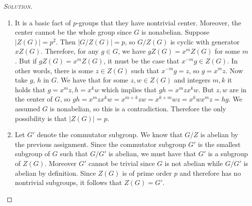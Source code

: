 \begin{proof}[{\scshape Solution}]

  \hfill

  \begin{enumerate}[font=\normalfont,label=\textbf{(\Alph*)}, wide]

    \item It is a basic fact of $p$-groups that they have nontrivial center. Moreover, the center cannot be the whole group since $G$ is nonabelian. Suppose $\lvert Z(G)\rvert = p^2$. Then $\lvert G/Z(G) \rvert = p$, so $G/Z(G)$ is cyclic with generator $xZ(G)$. Therefore, for any $g \in G$, we have $gZ(G) = x^mZ(G)$ for some $m$. But if $gZ(G) = x^mZ(G)$, it must be the case that $x^{-m} g \in Z(G)$. In other words, there is some $z\in Z(G)$ such that $x^{-m}g = z$, so $g = x^m z$. Now take $g$, $h$ in $G$. We have that for some $z, w \in Z(G)$ and integers $m, k$ it holds that $g = x^m z, h = x^k w$ which implies that $gh = x^mzx^kw$. But $z, w$ are in the center of $G$, so $gh = x^mzx^kw = x^{m+k}zw = x^{k+m}wz = x^kwx^mz = hg$. We assumed $G$ is nonabelian, so this is a contradiction. Therefore the only possibility is that $\lvert Z(G) \rvert = p$.

    \item Let $G'$ denote the commutator subgroup. We know that $G/Z$ is abelian by the previous assignment. Since the commutator subgroup $G'$ is the smallest subgroup of $G$ such that $G/G'$ is abelian, we must have that $G'$ is a subgroup of $Z(G)$. Moreover $G'$ cannot be trivial since $G$ is not abelian while $G/G'$ is abelian by definition. Since $Z(G)$ is of prime order $p$ and therefore has no nontrivial subgroups, it follows that $Z(G)=G'$.


\end{enumerate}
\end{proof}
